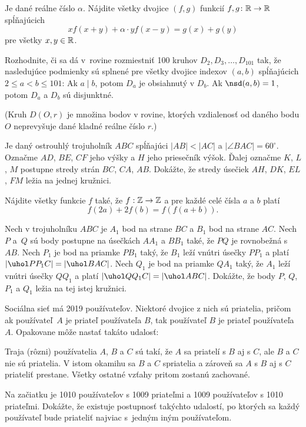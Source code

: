 {%
Je dané reálne číslo $\alpha$. Nájdite všetky dvojice $(f,g)$ funkcií $f,g\colon\Bbb{R}\to\Bbb{R}$ spĺňajúcich
$$
xf(x + y) + \alpha\cdot yf(x - y) = g(x) + g(y)
$$
pre všetky $x,y\in \Bbb{R}$.}

{%
Rozhodnite, či sa dá v~rovine rozmiestniť 100 kruhov $D_2, D_3,\dots,D_{101}$ tak, že nasledujúce podmienky sú splnené pre všetky dvojice indexov $(a,b)$ spĺňajúcich ${2\le a<b\le 101}$:
 Ak $a\mid b$, potom $D_a$ je obsiahnutý v $D_b$.
 Ak $\nsd(a,b)=1$, potom $D_a$ a $D_b$ sú disjunktné.

(Kruh $D(O,r)$ je množina bodov v rovine, ktorých vzdialenosť od daného bodu $O$ neprevyšuje dané kladné reálne číslo $r$.)}

{%
Je daný ostrouhlý trojuholník $ABC$ spĺňajúci $|AB|<|AC|$ a $|\angle BAC|=60^\circ$.
Označme $AD$, $BE$, $CF$ jeho výšky a $H$ jeho priesečník výšok.
Ďalej označme $K$, $L$, $M$ postupne stredy strán $BC$, $CA$, $AB$.
Dokážte, že stredy úsečiek $AH$, $DK$, $EL$, $FM$ ležia na jednej kružnici.}

{%
Nájdite všetky funkcie $f$ také,
že $f:\Bbb{Z}\to\Bbb{Z}$
a pre každé celé čísla $a$ a $b$ platí
$$f(2a)+2f(b)=f(f(a+b)).$$}

{%
Nech v trojuholníku $ABC$
je $A_1$ bod na strane $BC$
a $B_1$ bod na strane $AC$.
Nech $P$ a~$Q$ sú body postupne na úsečkách $AA_1$ a $BB_1$ také,
že $PQ$ je rovnobežná s $AB$.
Nech $P_1$ je bod na priamke $PB_1$ taký,
že $B_1$ leží vnútri úsečky $PP_1$
a platí
$|\uhol PP_1C|=|\uhol BAC|$.
Nech $Q_1$ je bod na priamke $QA_1$ taký,
že $A_1$ leží vnútri úsečky $QQ_1$
a platí
$|\uhol QQ_1C|=|\uhol ABC|$.
Dokážte,
že body $P$, $Q$, $P_1$ a $Q_1$
ležia na tej istej kružnici.}

{%
Sociálna sieť má 2019 používateľov.
Niektoré dvojice z nich sú priatelia,
pričom ak používateľ~$A$ je priateľ používateľa $B$,
tak používateľ $B$ je priateľ používateľa $A$.
Opakovane môže nastať takáto udalosť:

Traja (rôzni) používatelia $A$, $B$ a $C$ sú takí,
že $A$ sa priatelí s $B$ aj s $C$,
ale $B$ a $C$ nie sú priatelia.
V istom okamihu sa $B$ a $C$ spriatelia
a zároveň sa $A$ s $B$ aj s $C$ priateliť prestane.
Všetky ostatné vzťahy pritom zostanú zachované.

Na začiatku je 1010 používateľov s 1009 priateľmi
a 1009 používateľov s 1010 priateľmi.
Dokážte, že existuje postupnosť takýchto udalostí,
po ktorých sa každý používateľ bude priateliť najviac s~jedným iným používateľom.
}

